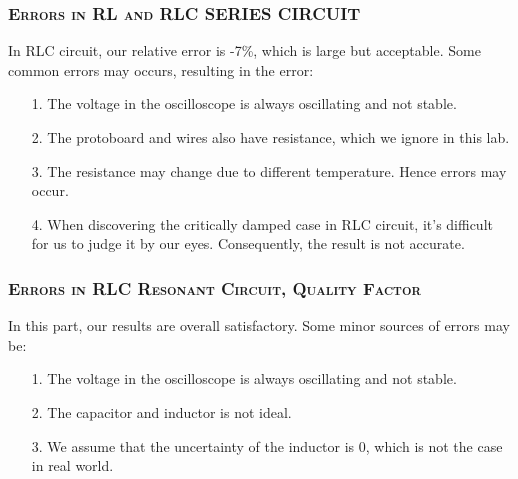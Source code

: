 \documentclass[a4paper,12pt]{article}
\begin{document}
\subsubsection{\textsc{Errors in RL and RLC SERIES CIRCUIT}}
	In RLC circuit, our relative error is -7\%, which is large but acceptable. Some common errors may occurs, resulting in the error:
	\begin{itemize}
	\item[1.] The voltage in the oscilloscope is always oscillating and not stable.
	\item[2.] The protoboard and wires also have resistance, which we ignore in this lab.
	\item[3.] The resistance may change due to different temperature. Hence errors may occur.
	\item[4.] When discovering the critically damped case in RLC circuit, it's difficult for us to judge it by our eyes. Consequently, the result is not accurate.
	\end{itemize}

\subsubsection{\textsc{Errors in RLC Resonant Circuit, Quality Factor}}
	In this part, our results are overall satisfactory. Some minor sources of errors may be:
\begin{itemize}
	\item[1.] The voltage in the oscilloscope is always oscillating and not stable.
	\item[2.] The capacitor and inductor is not ideal.
	\item[3.] We assume that the uncertainty of the inductor is 0, which is not the case in real world.
	\end{itemize}
	
\end{document}
